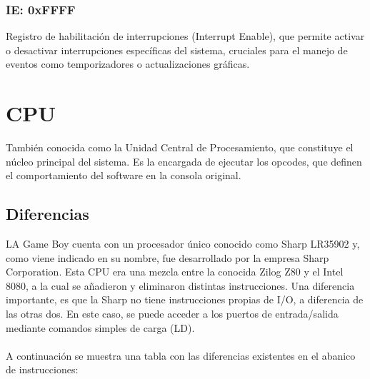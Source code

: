 \subsubsection{IE: 0xFFFF}
Registro de habilitación de interrupciones (Interrupt Enable), que permite activar o desactivar interrupciones específicas del sistema, cruciales para el manejo de eventos como temporizadores o actualizaciones gráficas.

\section{CPU}

También conocida como la Unidad Central de Procesamiento, que constituye el núcleo principal del sistema. Es la encargada de ejecutar los opcodes, que definen el comportamiento del software en la consola original.

\subsection{Diferencias}

LA Game Boy cuenta con un procesador único conocido como Sharp LR35902 y, como viene indicado en su nombre, fue desarrollado por la empresa Sharp Corporation. Esta CPU era una mezcla entre la conocida Zilog Z80 y el Intel 8080, a la cual se añadieron y eliminaron distintas instrucciones. Una diferencia importante, es que la Sharp no tiene instrucciones propias de I/O, a diferencia de las otras dos. En este caso, se puede acceder a los puertos de entrada/salida mediante comandos simples de carga (LD).
\\\\
A continuación se muestra una tabla con las diferencias existentes en el abanico de instrucciones:

